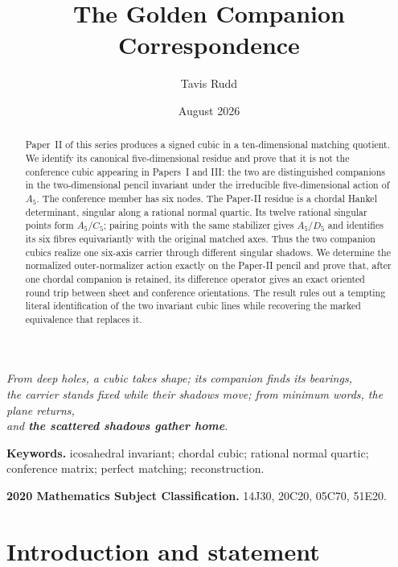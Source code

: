 \documentclass[11pt]{article}
\title{The Golden Companion Correspondence}
\author{Tavis Rudd}
\date{August 2026}
\theoremstyle{definition}
\theoremstyle{remark}
\begin{document}
\begingroup
\makeatletter
\let\clebschmaintitle\@title
\def\@title{\large\textsc{Clebsch: Rigidity from Sparse Shadows --- }\textbf{V}\\[0.7em]
  \LARGE\clebschmaintitle}
\makeatother
\maketitle
\endgroup

\begin{center}
\small\itshape
From deep holes, a cubic takes shape; its companion finds its bearings,\\
the carrier stands fixed while their shadows move; from minimum words, the plane returns,\\
and \textbf{the scattered shadows gather home}.
\end{center}

\begin{abstract}
Paper~II of this series produces a signed cubic in a ten-dimensional matching
quotient.  We identify its canonical five-dimensional residue and prove that
it is not the conference cubic appearing in Papers~I and III: the two are
distinguished companions in the two-dimensional pencil invariant under the
irreducible five-dimensional action of \(A_5\).  The conference member has
six nodes.  The Paper-II residue is a chordal Hankel determinant, singular
along a rational normal quartic.  Its twelve rational singular points form
\(A_5/C_5\); pairing points with the same stabilizer gives \(A_5/D_5\) and
identifies its six fibres equivariantly with the original matched axes.
Thus the two companion cubics realize one six-axis carrier through different
singular shadows.  We determine the normalized outer-normalizer action
exactly on the Paper-II pencil and prove that, after one chordal
companion is retained, its difference operator gives an exact oriented round
trip between sheet and conference orientations.  The result rules out a
tempting literal identification of the two invariant cubic lines while
recovering the marked equivalence that replaces it.
\end{abstract}

\noindent\textbf{Keywords.} icosahedral invariant; chordal cubic; rational
normal quartic; conference matrix; perfect matching; reconstruction.

\smallskip
\noindent\textbf{2020 Mathematics Subject Classification.} 14J30, 20C20,
05C70, 51E20.

\section{Introduction and statement}
\label{sec:introduction}
\end{document}
